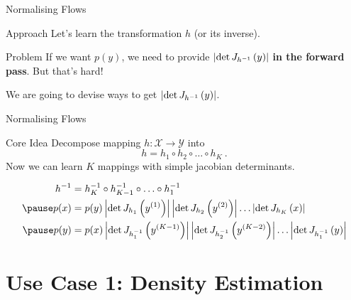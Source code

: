 \documentclass[14pt]{beamer}
\begin{document}
\begin{frame}{Normalising Flows}
\begin{block}{Approach}
Let's learn the transformation $ h $ (or its inverse).
\end{block}
\pause
\begin{block}{Problem}
If we want $ p(y) $, we need to provide $ \left|\det J_{h^{-1}}\left(y\right)\right| $ \textbf{in the forward pass}. But that's hard!
\end{block}
We are going to devise ways to get $ \left|\det J_{h^{-1}}\left(y\right)\right| $.
\end{frame}

\begin{frame}{Normalising Flows}
\begin{block}{Core Idea}
Decompose mapping $ h: \mathcal{X} \rightarrow \mathcal{Y} $ into 
\begin{equation*}
h = h_{1}\circ h_{2}\circ\ldots\circ h_K \ .
\end{equation*}
\pause
Now we can learn $ K $ mappings with simple jacobian determinants.
\begin{small}
\pause
\begin{equation*}
\begin{aligned}
h^{-1} &= h_{K}^{-1}\circ h_{K-1}^{-1} \circ \ldots \circ h_{1}^{-1} \\ \pause
p(x) &= p(y) \djac{h_{1}}{y^{(1)}}\djac{h_{2}}{y^{(2)}}\ldots \djac{h_{K}}{x} \\ \pause
p(y) &= p(x)\djac{h_{1}^{-1}}{y^{(K-1)}} \djac{h_{2}^{-1}}{y^{(K-2)}}\ldots \djac{h_{1}^{-1}}{y}
\end{aligned}
\end{equation*}
\end{small}
\end{block}
\end{frame}

\section{Use Case 1: Density Estimation}
\begin{frame}
\tableofcontents[current]
\end{frame}
\end{document}
